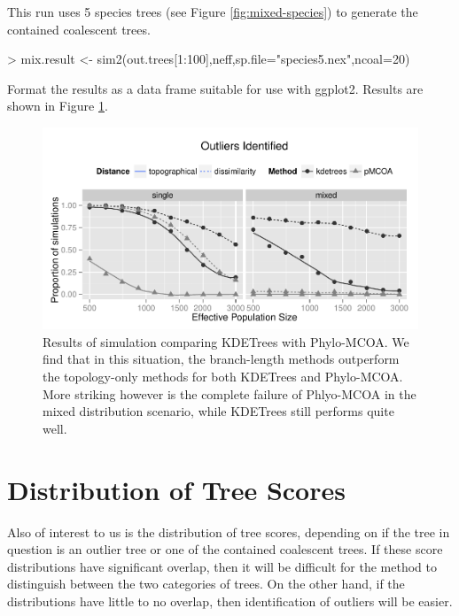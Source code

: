\documentclass{article}
\begin{document}
This run uses 5 species trees (see Figure \ref{fig:mixed-species}) to
generate the contained coalescent trees.
\begin{Schunk}
\begin{Sinput}
> mix.result <- sim2(out.trees[1:100],neff,sp.file="species5.nex",ncoal=20)
\end{Sinput}
\end{Schunk}
Format the results as a data frame suitable for use with
ggplot2. Results are shown in Figure \ref{fig:comparison}.
\begin{Schunk}
\end{Schunk}
\begin{figure}
  \centering
\includegraphics{simulation-013}
  \caption{Results of simulation comparing KDETrees with
    Phylo-MCOA. We find that in this situation, the branch-length
    methods outperform the topology-only methods for both KDETrees and
  Phylo-MCOA. More striking however is the complete failure of
  Phlyo-MCOA in the mixed distribution scenario, while KDETrees still
  performs quite well.}
  \label{fig:comparison}
\end{figure}

\section{Distribution of Tree Scores}
\label{sec:distr-tree-scor}
Also of interest to us is the distribution of tree scores, depending
on if the tree in question is an outlier tree or one of the contained
coalescent trees. If these score distributions have significant
overlap, then it will be difficult for the method to distinguish
between the two categories of trees. On the other hand, if the
distributions have little to no overlap, then identification of
outliers will be easier.
\end{document}
